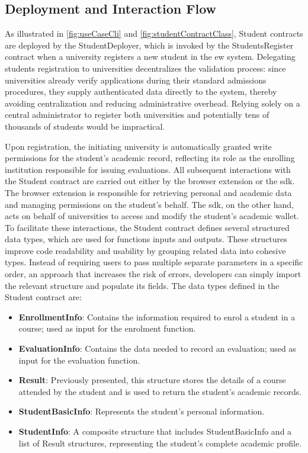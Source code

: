 \subsection{Deployment and Interaction Flow}
As illustrated in \cref{fig:useCaseCli} and \cref{fig:studentContractClass}, Student contracts are deployed by the StudentDeployer, which is invoked by the StudentsRegister contract when a university registers a new student in the \acrshort{ew} system. Delegating students registration to universities decentralizes the validation process: since universities already verify applications during their standard admissions procedures, they supply authenticated data directly to the system, thereby avoiding centralization and reducing administrative overhead. Relying solely on a central administrator to register both universities and potentially tens of thousands of students would be impractical.

Upon registration, the initiating university is automatically granted write permissions for the student's academic record, reflecting its role as the enrolling institution responsible for issuing evaluations. All subsequent interactions with the Student contract are carried out either by the browser extension or the \acrshort{sdk}. The browser extension is responsible for retrieving personal and academic data and managing permissions on the student's behalf. The \acrshort{sdk}, on the other hand, acts on behalf of universities to access and modify the student's academic wallet. To facilitate these interactions, the Student contract defines several structured data types, which are used for functions inputs and outputs. These structures improve code readability and usability by grouping related data into cohesive types. Instead of requiring users to  pass multiple separate parameters in a specific order, an approach that increases the risk of errors, developers can simply import the relevant structure and populate its fields. The data types defined in the Student contract are:

\begin{itemize}
    \item \textbf{EnrollmentInfo}: Contains the information required to enrol a student in a course; used as input for the enrolment function.
    \item \textbf{EvaluationInfo}: Contains the data needed to record an evaluation; used as input for the evaluation function.
    \item \textbf{Result}: Previously presented, this structure stores the details of a course attended by the student and is used to return the student's academic records.
    \item \textbf{StudentBasicInfo}: Represents the student's personal information.
    \item \textbf{StudentInfo}: A composite structure that includes StudentBasicInfo and a list of Result structures, representing the student’s complete academic profile.
\end{itemize}

